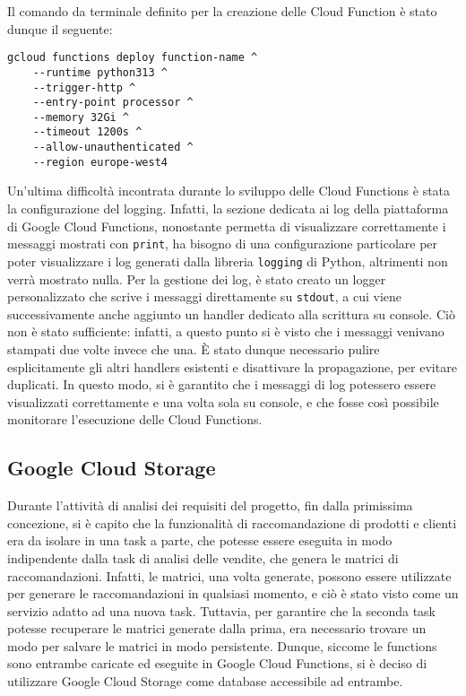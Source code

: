 Il comando da terminale definito per la creazione delle Cloud Function è stato dunque il seguente:
\begin{verbatim}
gcloud functions deploy function-name ^
    --runtime python313 ^
    --trigger-http ^
    --entry-point processor ^
    --memory 32Gi ^
    --timeout 1200s ^
    --allow-unauthenticated ^
    --region europe-west4
\end{verbatim}

Un'ultima difficoltà incontrata durante lo sviluppo delle Cloud Functions è stata la configurazione del logging. Infatti, la sezione dedicata ai log della piattaforma di Google Cloud Functions, nonostante permetta di visualizzare correttamente i messaggi mostrati con \texttt{print}, ha bisogno di una configurazione particolare per poter visualizzare i log generati dalla libreria \texttt{logging} di Python, altrimenti non verrà mostrato nulla. Per la gestione dei log, è stato creato un logger personalizzato che scrive i messaggi direttamente su \texttt{stdout}, a cui viene successivamente anche aggiunto un handler dedicato alla scrittura su console. 
Ciò non è stato sufficiente: infatti, a questo punto si è visto che i messaggi venivano stampati due volte invece che una. È stato dunque necessario pulire esplicitamente gli altri handlers esistenti e disattivare la propagazione, per evitare duplicati. In questo modo, si è garantito che i messaggi di log potessero essere visualizzati correttamente e una volta sola su console, e che fosse così possibile monitorare l'esecuzione delle Cloud Functions.

\subsection{Google Cloud Storage}

Durante l'attività di analisi dei requisiti del progetto, fin dalla primissima concezione, si è capito che la funzionalità di raccomandazione di prodotti e clienti era da isolare in una task a parte, che potesse essere eseguita in modo indipendente dalla task di analisi delle vendite, che genera le matrici di raccomandazioni. Infatti, le matrici, una volta generate, possono essere utilizzate per generare le raccomandazioni in qualsiasi momento, e ciò è stato visto come un servizio adatto ad una nuova task. Tuttavia, per garantire che la seconda task potesse recuperare le matrici generate dalla prima, era necessario trovare un modo per salvare le matrici in modo persistente. Dunque, siccome le functions sono entrambe caricate ed eseguite in Google Cloud Functions, si è deciso di utilizzare Google Cloud Storage come database accessibile ad entrambe.

